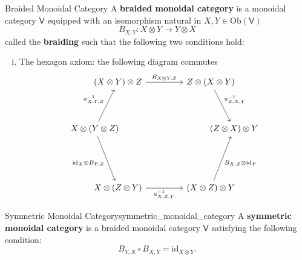 \begin{definition}{Braided Monoidal Category}{}
    A \textbf{braided monoidal category} is a monoidal category $\mathsf{V}$ equipped with an isomorphism natural in $X,Y\in \mathrm{Ob}(\mathsf{V})$
    \[
        B_{X,Y} : X \otimes Y \to Y \otimes X
    \]
    called the \textbf{braiding} such that the following two conditions hold:
    \begin{enumerate}[(i)]
        \item The hexagon axiom: the following diagram commutes
        \[
            \begin{tikzcd}[ampersand replacement=\&, column sep=small]
                \&[-50pt] (X\otimes Y)\otimes Z\arrow[rr, "{B_{X\otimes Y,Z}}"]\&[+45pt]  \&[-25pt] Z\otimes (X\otimes Y) \arrow[rd, "{a_{Z,X,Y}^{-1}}"] \&[-50pt] \\[+20pt]
                X\otimes (Y\otimes Z)\arrow[ru, "{a_{X,Y,Z}^{-1}}"] \arrow[rd, "{\mathrm{id}_X\otimes B_{Y,Z}}"'] \& \& \& \& (Z\otimes X)\otimes Y \\[+35pt]
                \& X\otimes (Z\otimes Y) \arrow[rr, "{a_{X,Z,Y}^{-1}}"'] \& \& (X\otimes Z)\otimes Y\arrow[ru, "{B_{X,Z}\otimes\mathrm{id}_Y}"']  \& 
            \end{tikzcd}
        \]
    \end{enumerate}
\end{definition}


\begin{definition}{Symmetric Monoidal Category}{symmetric_monoidal_category}
    A \textbf{symmetric monoidal category} is a braided monoidal category $\mathsf{V}$ satisfying the following condition:
    \[
        B_{Y,X}\circ B_{X,Y}=\mathrm{id}_{X\otimes Y}.
    \]
\end{definition}

